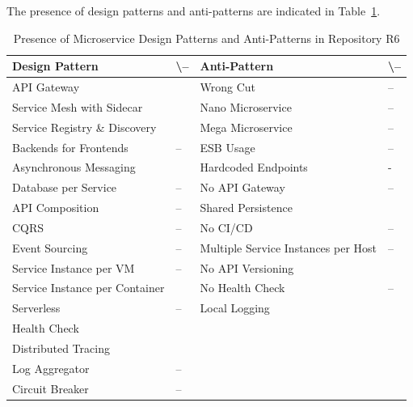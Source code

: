 \documentclass{Configuration_Files/PoliMi3i_thesis}
\newcommand{\cmark}{\ding{51}}%
\begin{document}
The presence of design patterns and anti-patterns are indicated in Table~\ref{table:R6_result}.

\begin{table}[H]
\centering 
    \begin{tabular}{ 
  | >{\centering\arraybackslash} m{16em} 
  | >{\centering\arraybackslash} m{2.2em} 
  | >{\centering\arraybackslash} m{16em} 
  | >{\centering\arraybackslash} m{2.2em} | }
    \hline
    \rowcolor{bluepoli!40}
    \textbf{Design Pattern} & \cmark \textbackslash – & \textbf{Anti-Pattern} & \cmark \textbackslash – \T\B \\
    \hline \hline
    API Gateway & \cmark & Wrong Cut & – \T\B\\
    \hline
    \rowcolor{bluepoli!10}
    Service Mesh with Sidecar & \cmark & Nano Microservice & – \T\B \\
    \hline
    Service Registry \& Discovery & \cmark & Mega Microservice & – \T\B \\
    \hline
    \rowcolor{bluepoli!10}
    Backends for Frontends & – & ESB Usage & – \T\B \\
    \hline
    Asynchronous Messaging & \cmark & Hardcoded Endpoints & - \T\B \\
    \hline
    \rowcolor{bluepoli!10}
    Database per Service & – & No API Gateway & – \T\B \\
    \hline
    API Composition & – & Shared Persistence & \cmark \T\B \\
    \hline
    \rowcolor{bluepoli!10}
    CQRS & – & No CI/CD & – \T\B \\
    \hline
    Event Sourcing & – & Multiple Service Instances per Host & – \T\B \\
    \hline
    \rowcolor{bluepoli!10}
    Service Instance per VM & – & No API Versioning & \cmark \T\B \\
    \hline
    Service Instance per Container & \cmark & No Health Check & – \T\B \\
    \hline
    \rowcolor{bluepoli!10}
    Serverless & – & Local Logging & \cmark \T\B \\
    \hline
    Health Check & \cmark &  & \T\B \\
    \hline
    \rowcolor{bluepoli!10}
    Distributed Tracing & \cmark & & \T\B \\
    \hline
    Log Aggregator & – &  & \T\B \\
    \hline
    \rowcolor{bluepoli!10}
    Circuit Breaker & – &  & \T\B \\
    \hline
    \end{tabular}
    \\[10pt]
    \caption{Presence of Microservice Design Patterns and Anti-Patterns in Repository R6}
    \label{table:R6_result}
\end{table}
\end{document}
